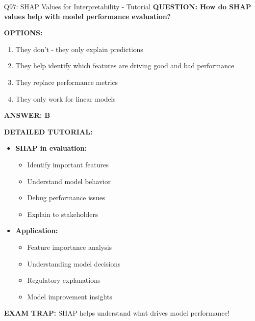 \documentclass[8pt]{beamer}
\begin{document}
\begin{frame}{Q97: SHAP Values for Interpretability - Tutorial}
	\fontsize{6.5}{7.5}\selectfont
	\textbf{QUESTION: How do SHAP values help with model performance evaluation?}
	
	\vspace{0.1cm}
	\textbf{OPTIONS:}
	\begin{enumerate}
		\item They don't - they only explain predictions
		\item They help identify which features are driving good and bad performance
		\item They replace performance metrics
		\item They only work for linear models
	\end{enumerate}
	
	\vspace{0.1cm}
	\textcolor{myblue}{\textbf{ANSWER: B}}
	
	\vspace{0.1cm}
	\textbf{DETAILED TUTORIAL:}
	\begin{itemize}
		\item \textbf{SHAP in evaluation:}
		\begin{itemize}
			\item Identify important features
			\item Understand model behavior
			\item Debug performance issues
			\item Explain to stakeholders
		\end{itemize}
		\item \textbf{Application:}
		\begin{itemize}
			\item Feature importance analysis
			\item Understanding model decisions
			\item Regulatory explanations
			\item Model improvement insights
		\end{itemize}
	\end{itemize}
	
	\textcolor{myred}{\textbf{EXAM TRAP:}} SHAP helps \textcolor{myblue}{understand what drives model performance}!
\end{frame}
\end{document}
